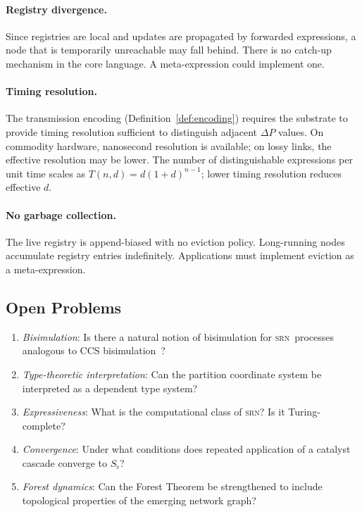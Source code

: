 \documentclass[twocolumn,11pt,a4paper]{article}
\theoremstyle{definition}
\theoremstyle{remark}
\newcommand{\srn}{\textsc{srn}}
\newcommand{\floor}{S_{\flat}}
\begin{document}
\paragraph{Registry divergence.}
Since registries are local and updates are propagated by forwarded
expressions, a node that is temporarily unreachable may fall behind.
There is no catch-up mechanism in the core language.  A meta-expression
could implement one.

\paragraph{Timing resolution.}
The transmission encoding (Definition~\ref{def:encoding}) requires the
substrate to provide timing resolution sufficient to distinguish adjacent
$\Delta P$ values.  On commodity hardware, nanosecond resolution is
available; on lossy links, the effective resolution may be lower.  The
number of distinguishable expressions per unit time scales as
$T(n, d) = d(1+d)^{n-1}$; lower timing resolution reduces effective
$d$.

\paragraph{No garbage collection.}
The live registry is append-biased with no eviction policy.  Long-running
nodes accumulate registry entries indefinitely.  Applications must
implement eviction as a meta-expression.

\subsection{Open Problems}

\begin{enumerate}[noitemsep,topsep=2pt]
\item \emph{Bisimulation}: Is there a natural notion of bisimulation
  for \srn\ processes analogous to CCS bisimulation~\cite{milner1989communication}?
\item \emph{Type-theoretic interpretation}: Can the partition coordinate
  system be interpreted as a dependent type system?
\item \emph{Expressiveness}: What is the computational class of \srn?
  Is it Turing-complete?
\item \emph{Convergence}: Under what conditions does repeated application
  of a catalyst cascade converge to $\floor$?
\item \emph{Forest dynamics}: Can the Forest Theorem be strengthened
  to include topological properties of the emerging network graph?
\end{enumerate}
\end{document}
